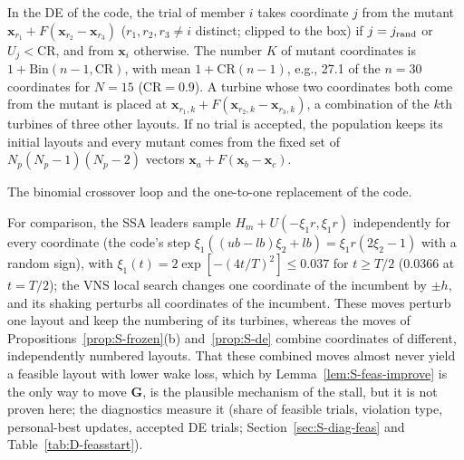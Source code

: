 \begin{thS}
\label{prop:S-de}
In the DE of the code, the trial of member $i$ takes coordinate $j$ from the mutant $\mathbf x_{r_1}+F(\mathbf x_{r_2}-\mathbf x_{r_3})$ ($r_1,r_2,r_3\ne i$ distinct; clipped to the box) if $j=j_{\rm rand}$ or $U_j<\mathrm{CR}$, and from $\mathbf x_i$ otherwise. The number $K$ of mutant coordinates is $1+\mathrm{Bin}(n-1,\mathrm{CR})$, with mean $1+\mathrm{CR}(n-1)$, e.g., 27.1 of the $n=30$ coordinates for $N=15$ ($\mathrm{CR}=0.9$). A turbine whose two coordinates both come from the mutant is placed at $\mathbf x_{r_1,k}+F(\mathbf x_{r_2,k}-\mathbf x_{r_3,k})$, a combination of the $k$th turbines of three other layouts. If no trial is accepted, the population keeps its initial layouts and every mutant comes from the fixed set of $N_p(N_p-1)(N_p-2)$ vectors $\mathbf x_a+F(\mathbf x_b-\mathbf x_c)$.
\end{thS}
\begin{thSproof}
The binomial crossover loop and the one-to-one replacement of the code.
\end{thSproof}

For comparison, the SSA leaders sample $H_m+U(-\xi_1r,\xi_1r)$ independently for every coordinate (the code's step $\xi_1((ub-lb)\xi_2+lb)=\xi_1r(2\xi_2-1)$ with a random sign), with $\xi_1(t)=2\exp[-(4t/T)^2]\le0.037$ for $t\ge T/2$ ($0.0366$ at $t=T/2$); the VNS local search changes one coordinate of the incumbent by $\pm h$, and its shaking perturbs all coordinates of the incumbent. These moves perturb one layout and keep the numbering of its turbines, whereas the moves of Propositions~\ref{prop:S-frozen}(b) and~\ref{prop:S-de} combine coordinates of different, independently numbered layouts. That these combined moves almost never yield a feasible layout with lower wake loss, which by Lemma~\ref{lem:S-feas-improve} is the only way to move $\mathbf G$, is the plausible mechanism of the stall, but it is not proven here; the diagnostics measure it (share of feasible trials, violation type, personal-best updates, accepted DE trials; Section~\ref{sec:S-diag-feas} and Table~\ref{tab:D-feasstart}).

